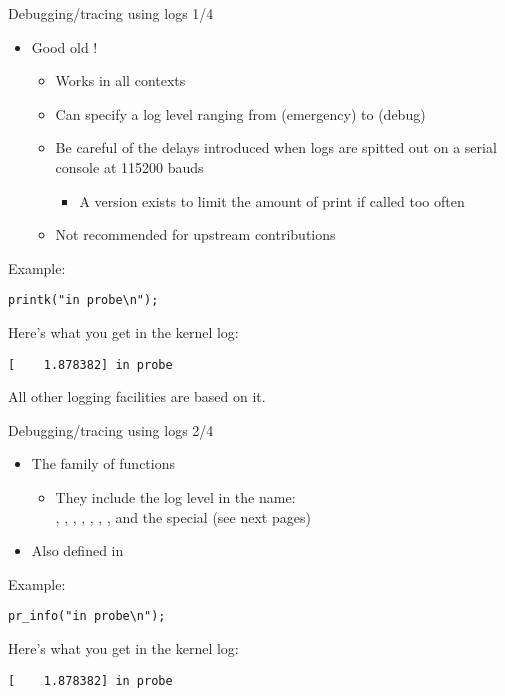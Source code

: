 \begin{frame}[fragile]{Debugging/tracing using logs 1/4}
  \begin{itemize}
  \item Good old !
    \begin{itemize}
    \item Works in all contexts
    \item Can specify a log level ranging from  (emergency) to
       (debug)
    \item Be careful of the delays introduced when logs are spitted out on a
      serial console at 115200 bauds
      \begin{itemize}
      \item A  version exists to limit the amount of
        print if called too often
      \end{itemize}
    \item Not recommended for upstream contributions
    \end{itemize}
  \end{itemize}
  Example:
  \begin{verbatim}
printk("in probe\n");
  \end{verbatim}
  Here's what you get in the kernel log:
\begin{verbatim}
[    1.878382] in probe
\end{verbatim}
All other logging facilities are based on it.
\end{frame}

\begin{frame}[fragile]{Debugging/tracing using logs 2/4}
  \begin{itemize}
  \item The  family of functions
    \begin{itemize}
    \item They include the log level in the name:\\
      , , ,
      , , , ,
       and the special  (see next pages)
    \end{itemize}
  \item Also defined in 
  \end{itemize}
  Example:
  \begin{verbatim}
pr_info("in probe\n");
  \end{verbatim}
  Here's what you get in the kernel log:
\begin{verbatim}
[    1.878382] in probe
\end{verbatim}
\end{frame}

